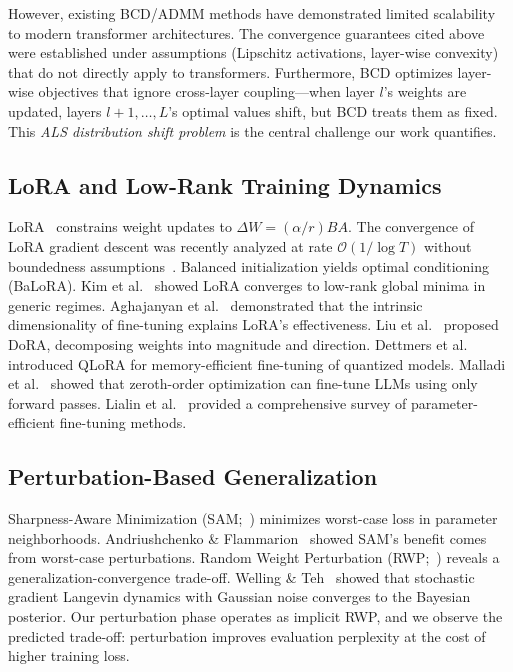 \documentclass[11pt]{article}
\begin{document}
However, existing BCD/ADMM methods have demonstrated limited scalability to modern transformer architectures. The convergence guarantees cited above were established under assumptions (Lipschitz activations, layer-wise convexity) that do not directly apply to transformers. Furthermore, BCD optimizes layer-wise objectives that ignore cross-layer coupling---when layer $l$'s weights are updated, layers $l+1, \ldots, L$'s optimal values shift, but BCD treats them as fixed. This \textit{ALS distribution shift problem} is the central challenge our work quantifies.

\subsection{LoRA and Low-Rank Training Dynamics}

LoRA~\cite{hu2022lora} constrains weight updates to $\Delta W = (\alpha/r)BA$. The convergence of LoRA gradient descent was recently analyzed at rate $\mathcal{O}(1/\log T)$ without boundedness assumptions~\cite{anonymous2025convergence}. Balanced initialization yields optimal conditioning (BaLoRA). Kim et al.~\cite{kim2025lora} showed LoRA converges to low-rank global minima in generic regimes. Aghajanyan et al.~\cite{aghajanyan2021intrinsic} demonstrated that the intrinsic dimensionality of fine-tuning explains LoRA's effectiveness. Liu et al.~\cite{liu2024dora} proposed DoRA, decomposing weights into magnitude and direction. Dettmers et al.~\cite{dettmers2024qlora} introduced QLoRA for memory-efficient fine-tuning of quantized models. Malladi et al.~\cite{malladi2023fine} showed that zeroth-order optimization can fine-tune LLMs using only forward passes. Lialin et al.~\cite{lialin2023scaling} provided a comprehensive survey of parameter-efficient fine-tuning methods.

\subsection{Perturbation-Based Generalization}

Sharpness-Aware Minimization (SAM;~\cite{foret2021sharpness}) minimizes worst-case loss in parameter neighborhoods. Andriushchenko \& Flammarion~\cite{andriushchenko2022towards} showed SAM's benefit comes from worst-case perturbations. Random Weight Perturbation (RWP;~\cite{li2024revisiting}) reveals a generalization-convergence trade-off. Welling \& Teh~\cite{welling2011bayesian} showed that stochastic gradient Langevin dynamics with Gaussian noise converges to the Bayesian posterior. Our perturbation phase operates as implicit RWP, and we observe the predicted trade-off: perturbation improves evaluation perplexity at the cost of higher training loss.
\end{document}
